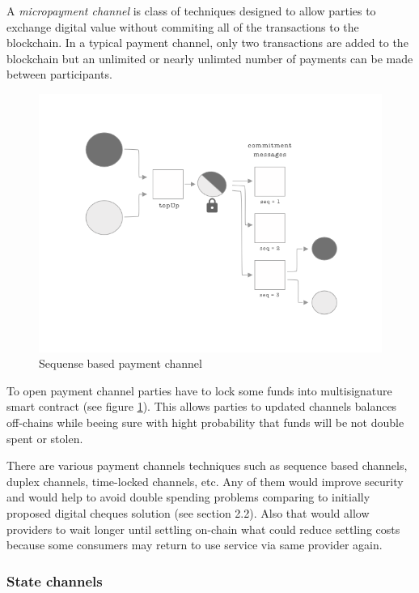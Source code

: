 \documentclass[a4paper,12pt]{article}
\begin{document}
A \textit{micropayment channel} is class of techniques designed to allow parties
to exchange digital value without commiting all of the transactions to the 
blockchain. In a typical payment channel, only two transactions are added to the 
blockchain but an unlimited or nearly unlimted number of payments can be made 
between participants.

\begin{figure}[H]
    \centering
    \includegraphics[scale=0.5]{../img/payment-channel}
    \caption{Sequense based payment channel}
    \label{img:payment-channel}
\end{figure}

To open payment channel parties have to lock some funds into multisignature 
smart contract (see figure \ref{img:payment-channel}). This allows parties to
updated channels balances off-chains while beeing sure with hight probability 
that funds will be not double spent or stolen.

There are various payment channels techniques such as sequence based channels, 
duplex channels, time-locked channels, etc. Any of them would improve security 
and would help to avoid double spending problems comparing to initially proposed
digital cheques solution (see section 2.2). Also that would allow providers to
wait longer until settling on-chain what could reduce settling costs because 
some consumers may return to use service via same provider again. \\

\subsubsection{State channels}
\end{document}
